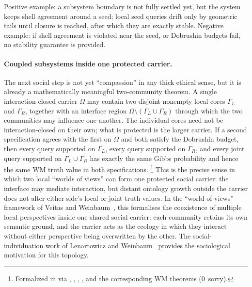 \documentclass[11pt,openany]{report}
\begin{document}
\noindent
Positive example: a subsystem boundary is not fully settled yet, but the
system keeps shell agreement around a seed; local seed queries drift only by
geometric tails until closure is reached, after which they are exactly
stable.
Negative example: if shell agreement is violated near the seed, or Dobrushin
budgets fail, no stability guarantee is provided.

\paragraph{Coupled subsystems inside one protected carrier.}

The next social step is not yet ``compassion'' in any thick ethical sense,
but it is already a mathematically meaningful two-community theorem.  A
single interaction-closed carrier $\Omega$ may contain two disjoint
nonempty local cores $\Gamma_L$ and $\Gamma_R$, together with an interface
region $\Omega \setminus (\Gamma_L \cup \Gamma_R)$ through which the two
communities may influence one another.  The individual cores need not be
interaction-closed on their own; what is protected is the larger carrier.
If a second specification agrees with the first on $\Omega$ and both satisfy
the Dobrushin budget, then every query supported on $\Gamma_L$, every query
supported on $\Gamma_R$, and every joint query supported on
$\Gamma_L \cup \Gamma_R$ has exactly the same Gibbs probability and hence
the same WM truth value in both specifications.%
\footnote{Formalized in
via ,
,
,
, and the
corresponding WM theorems (0~sorry).}
This is the precise sense in which two local ``worlds of views'' can form
one protected social carrier: the interface may mediate interaction, but
distant ontology growth outside the carrier does not alter either side's
local or joint truth values.
In the ``world of views'' framework of Veitas and
Weinbaum~\cite{VeitasWeinbaum2017}, this formalises the coexistence of
multiple local perspectives inside one shared social carrier: each community
retains its own semantic ground, and the carrier acts as the ecology in which
they interact without either perspective being overwritten by the other.
The social-individuation work of Lenartowicz and
Weinbaum~\cite{LenartowiczWeinbaum2016} provides the sociological motivation
for this topology.
\end{document}
